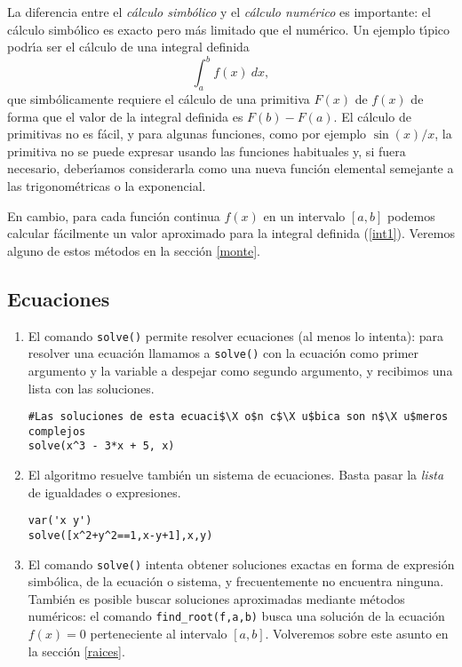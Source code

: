 La diferencia entre el {\itshape c\'alculo simb\'olico} y el {\itshape c\'alculo
num\'erico} es importante: el c\'alculo simb\'olico es exacto pero m\'as
limitado que el num\'erico. Un ejemplo t\'{\i}pico podr\'{\i}a ser el c\'alculo
de una integral definida 
\begin{equation}\label{int1}
\int_a^b f(x)\ dx,
\end{equation}
\noindent que simb\'olicamente requiere el c\'alculo de una primitiva $F(x)$ de
$f(x)$ de forma que el valor de la integral definida es $F(b)-F(a)$. El
c\'alculo de primitivas no es f\'acil, y para algunas funciones, como por
ejemplo $\sin(x)/x$, la primitiva no se puede expresar usando las 
funciones
habituales y, si fuera necesario, deber\'{\i}amos considerarla como una nueva
funci\'on elemental semejante a las trigonom\'etricas o la exponencial.

En cambio, para cada funci\'on continua $f(x)$ en un intervalo $[a,b]$ podemos 
calcular f\'acilmente un valor aproximado para la integral definida 
(\ref{int1}). Veremos alguno de estos m\'etodos en la secci\'on  \ref{monte}.


\subsection{Ecuaciones}
\begin{enumerate}
  \item El comando  \lstinline|solve()|  permite resolver ecuaciones (al menos
lo
intenta): para resolver una ecuación llamamos a \lstinline|solve()| con la
ecuación como primer
argumento y la variable a despejar como segundo argumento, y recibimos una lista
con las
soluciones.
\begin{lstlisting}[numbers=none]
#Las soluciones de esta ecuaci$\X o$n c$\X u$bica son n$\X u$meros complejos
solve(x^3 - 3*x + 5, x)
\end{lstlisting}

 \item El algoritmo resuelve también un sistema de ecuaciones. Basta pasar la
\emph{lista} de igualdades o expresiones.
 \begin{lstlisting}[numbers=none]
var('x y')
solve([x^2+y^2==1,x-y+1],x,y)
\end{lstlisting}
\item El comando \lstinline|solve()| intenta obtener soluciones exactas en forma
de expresi\'on simb\'olica,  de la ecuaci\'on o sistema,
y frecuentemente no encuentra ninguna. Tambi\'en es posible buscar soluciones
aproximadas mediante m\'etodos num\'ericos:  el comando
\lstinline|find_root(f,a,b)| busca una soluci\'on de la ecuaci\'on $f(x)=0$ 
perteneciente al intervalo $[a,b]$. Volveremos sobre este asunto en la secci\'on
\ref{raices}.
 
\end{enumerate}


